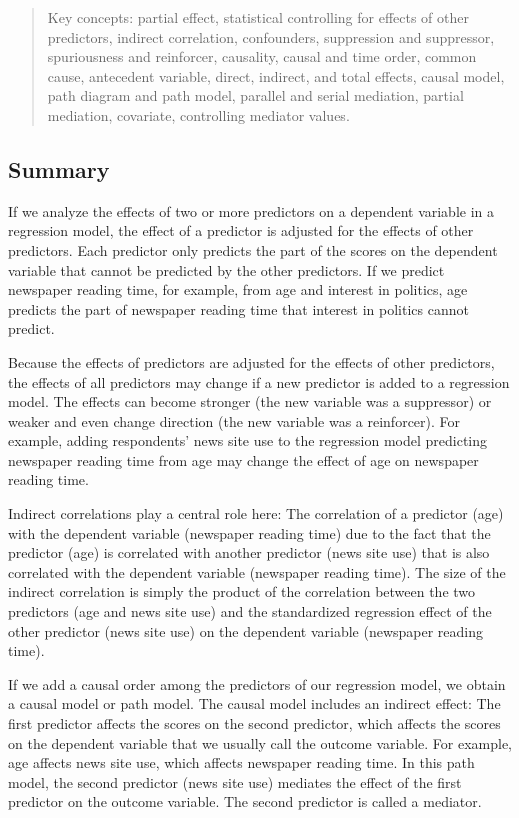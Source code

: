 \documentclass[a4paper]{book}
\theoremstyle{definition}
\theoremstyle{definition}
\theoremstyle{definition}
\theoremstyle{remark}
\begin{document}
\begin{quote}
Key concepts: partial effect, statistical controlling for effects of
other predictors, indirect correlation, confounders, suppression and
suppressor, spuriousness and reinforcer, causality, causal and time
order, common cause, antecedent variable, direct, indirect, and total
effects, causal model, path diagram and path model, parallel and serial
mediation, partial mediation, covariate, controlling mediator values.
\end{quote}

\subsection*{Summary}\label{summary-8}

If we analyze the effects of two or more predictors on a dependent
variable in a regression model, the effect of a predictor is adjusted
for the effects of other predictors. Each predictor only predicts the
part of the scores on the dependent variable that cannot be predicted by
the other predictors. If we predict newspaper reading time, for example,
from age and interest in politics, age predicts the part of newspaper
reading time that interest in politics cannot predict.

Because the effects of predictors are adjusted for the effects of other
predictors, the effects of all predictors may change if a new predictor
is added to a regression model. The effects can become stronger (the new
variable was a suppressor) or weaker and even change direction (the new
variable was a reinforcer). For example, adding respondents' news site
use to the regression model predicting newspaper reading time from age
may change the effect of age on newspaper reading time.

Indirect correlations play a central role here: The correlation of a
predictor (age) with the dependent variable (newspaper reading time) due
to the fact that the predictor (age) is correlated with another
predictor (news site use) that is also correlated with the dependent
variable (newspaper reading time). The size of the indirect correlation
is simply the product of the correlation between the two predictors (age
and news site use) and the standardized regression effect of the other
predictor (news site use) on the dependent variable (newspaper reading
time).

If we add a causal order among the predictors of our regression model,
we obtain a causal model or path model. The causal model includes an
indirect effect: The first predictor affects the scores on the second
predictor, which affects the scores on the dependent variable that we
usually call the outcome variable. For example, age affects news site
use, which affects newspaper reading time. In this path model, the
second predictor (news site use) mediates the effect of the first
predictor on the outcome variable. The second predictor is called a
mediator.
\end{document}
